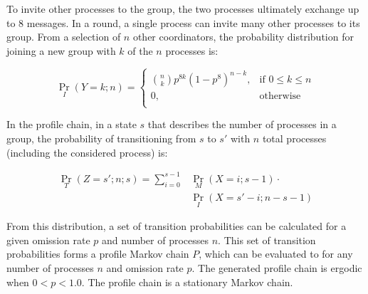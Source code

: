 To invite other processes to the group, the two processes ultimately exchange up to 8 messages.
In a round, a single process can invite many other processes to its group.
From a selection of $n$ other coordinators, the probability distribution for joining a new group with $k$ of the $n$ processes is:

\begin{equation}
	\Pr_{I}(Y=k; n) =
	\begin{cases}
		\binom{n}{k} p^{8k}(1-p^8)^{n-k}, & \text{if } 0 \leq k \leq n \\
		0,                                & \text{otherwise} \\
	\end{cases}
\end{equation}

In the profile chain, in a state $s$ that describes the number of processes in a group, the probability of transitioning from $s$ to $s'$ with $n$ total processes (including the considered process) is:

\begin{align} \Pr_{T}(Z=s'; n; s) = \sum_{i=0}^{s-1} &\Pr_{M}(X=i; s-1) \cdot
\nonumber \\ &\Pr_{I}(X=s'-i; n-s-1) \end{align}

From this distribution, a set of transition probabilities can be calculated for a given omission rate $p$ and number of processes $n$.
This set of transition probabilities forms a profile Markov chain $P$, which can be evaluated to for any number of processes $n$ and omission rate $p$.
The generated profile chain is ergodic when $0<p<1.0$. The profile chain is a stationary Markov chain.
